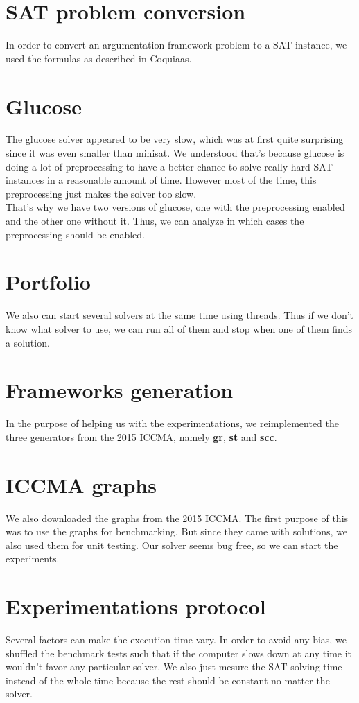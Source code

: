 \documentclass[11pt]{article}
\begin{document}
\section{SAT problem conversion}
In order to convert an argumentation framework problem to a SAT instance, we used the formulas as described in Coquiaas.\cite{lagniez2015coquiaas}

\section{Glucose}
The glucose solver appeared to be very slow, which was at first quite surprising since it was even smaller than minisat. We understood that's because glucose is doing a lot of preprocessing to have a better chance to solve really hard SAT instances in a reasonable amount of time. However most of the time, this preprocessing just makes the solver too slow. \\
That's why we have two versions of glucose, one with the preprocessing enabled and the other one without it. Thus, we can analyze in which cases the preprocessing should be enabled.

\section{Portfolio}
We also can start several solvers at the same time using threads. Thus if we don't know what solver to use, we can run all of them and stop when one of them finds a solution.

\section{Frameworks generation}
In the purpose of helping us with the experimentations, we reimplemented the three generators from the 2015 ICCMA\cite{arg2017Generator}, namely \textbf{gr}, \textbf{st} and \textbf{scc}.

\section{ICCMA graphs}
We also downloaded the graphs from the 2015 ICCMA. The first purpose of this was to use the graphs for benchmarking. But since they came with solutions, we also used them for unit testing. Our solver seems bug free, so we can start the experiments.

\section{Experimentations protocol}
Several factors can make the execution time vary. In order to avoid any bias, we shuffled the benchmark tests such that if the computer slows down at any time it wouldn't favor any particular solver. We also just mesure the SAT solving time instead of the whole time because the rest should be constant no matter the solver.



\end{document}
